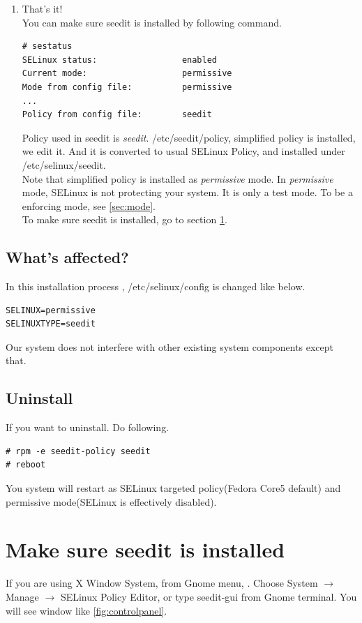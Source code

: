 \documentclass{article}
\begin{document}
\begin{enumerate}
 \item That's it!\\
You can make sure seedit is installed by following command.
\begin{verbatim}
# sestatus
SELinux status:                 enabled
Current mode:                   permissive
Mode from config file:          permissive
...
Policy from config file:        seedit
\end{verbatim}

Policy used in seedit is {\it seedit}.
/etc/seedit/policy, simplified policy is installed, we edit it.
And it is converted to usual SELinux Policy, and installed under  /etc/selinux/seedit.\\
Note that simplified policy is installed as {\it permissive} mode.
In {\it permissive} mode, SELinux is not protecting your system. It is
 only a test mode. To be a enforcing mode, see \ref{sec:mode}.\\
To make sure seedit is installed, go to section \ref{sec:makesure}.
\end{enumerate}

 \subsection{What's affected?}
 In this installation process ,
/etc/selinux/config is changed like below.
\begin{verbatim}
SELINUX=permissive	
SELINUXTYPE=seedit
\end{verbatim}
Our system does not interfere with other existing system components
except that.
\subsection{Uninstall}
If you want to uninstall. Do following.
\begin{verbatim}
# rpm -e seedit-policy seedit	
# reboot
\end{verbatim}
You system will restart as SELinux targeted policy(Fedora Core5 default)
and permissive mode(SELinux is effectively disabled).

\section{Make sure seedit is installed}\label{sec:makesure}

If you are using X Window System,  from  Gnome menu, 
. Choose System $\rightarrow$ Manage $\rightarrow$ SELinux
Policy Editor, or type seedit-gui from Gnome terminal.
You will see window like \ref{fig:controlpanel}.
\end{document}
